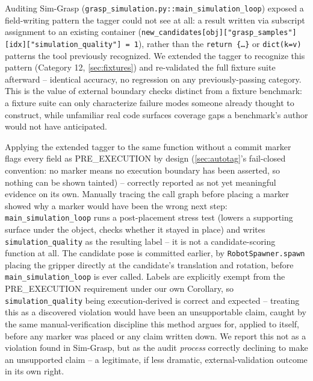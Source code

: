 \documentclass[journal]{IEEEtran}
\begin{document}
Auditing Sim-Grasp \cite{simgrasp2024}
(\texttt{grasp\_simulation.py::main\_simulation\_loop}) exposed a
field-writing pattern the tagger could not see at all: a result written
via subscript assignment to an existing container
(\texttt{new\_candidates[obj]["grasp\_samples"][idx]["simulation\_quality"]
= 1}), rather than the \texttt{return \{\ldots\}} or
\texttt{dict(k=v)} patterns the tool previously recognized. We extended
the tagger to recognize this pattern (Category 12,
\cref{sec:fixtures}) and re-validated the full fixture suite afterward --
identical accuracy, no regression on any previously-passing category.
This is the value of external boundary checks distinct from a fixture
benchmark: a fixture suite can only characterize failure modes someone
already thought to construct, while unfamiliar real code surfaces
coverage gaps a benchmark's author would not have anticipated.

Applying the extended tagger to the same function without a commit marker
flags every field as PRE\_EXECUTION by design (\cref{sec:autotag}'s
fail-closed convention: no marker means no execution boundary has been
asserted, so nothing can be shown tainted) -- correctly reported as not
yet meaningful evidence on its own. Manually tracing the call graph before
placing a marker showed why a marker would have been the wrong next step:
\texttt{main\_simulation\_loop} runs a post-placement stress test (lowers
a supporting surface under the object, checks whether it stayed in place)
and writes \texttt{simulation\_quality} as the resulting label -- it is
not a candidate-scoring function at all. The candidate pose is committed
earlier, by \texttt{RobotSpawner.spawn} placing the gripper directly at
the candidate's translation and rotation, before
\texttt{main\_simulation\_loop} is ever called. Labels are explicitly
exempt from the PRE\_EXECUTION requirement under our own Corollary, so
\texttt{simulation\_quality} being execution-derived is correct and
expected -- treating this as a discovered violation would have been an
unsupportable claim, caught by the same manual-verification discipline
this method argues for, applied to itself, before any marker was placed
or any claim written down. We report this not as a violation found in
Sim-Grasp, but as the audit \emph{process} correctly declining to make an
unsupported claim -- a legitimate, if less dramatic, external-validation
outcome in its own right.
\end{document}
